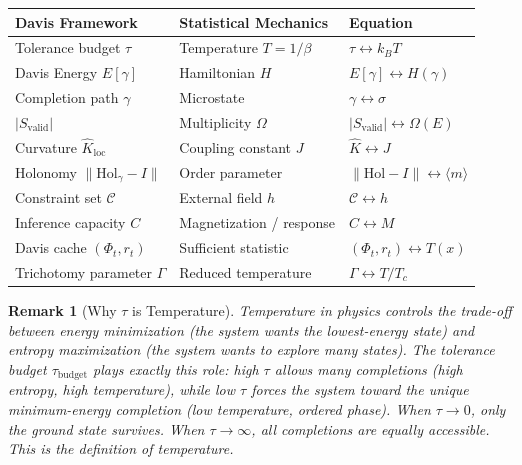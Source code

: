 \documentclass[11pt,letterpaper]{article}
\newtheorem{remark}[conjecture]{Remark}
\newcommand{\Hol}{\mathrm{Hol}}
\newcommand{\Khat}{\hat{K}}
\newcommand{\tbudget}{\tau_{\mathrm{budget}}}
\newcommand{\Svalid}{S_{\mathrm{valid}}}
\begin{document}
\begin{center}
\renewcommand{\arraystretch}{1.4}
\begin{tabular}{lll}
\textbf{Davis Framework} & \textbf{Statistical Mechanics} & \textbf{Equation} \\
\hline
Tolerance budget $\tau$ & Temperature $T = 1/\beta$ & $\tau \leftrightarrow k_B T$ \\
Davis Energy $E[\gamma]$ & Hamiltonian $H$ & $E[\gamma] \leftrightarrow H(\gamma)$ \\
Completion path $\gamma$ & Microstate & $\gamma \leftrightarrow \sigma$ \\
$|\Svalid|$ & Multiplicity $\Omega$ & $|\Svalid| \leftrightarrow \Omega(E)$ \\
Curvature $\Khat_{\mathrm{loc}}$ & Coupling constant $J$ & $\Khat \leftrightarrow J$ \\
Holonomy $\|\Hol_\gamma - I\|$ & Order parameter & $\|\Hol - I\| \leftrightarrow \langle m \rangle$ \\
Constraint set $\mathcal{C}$ & External field $h$ & $\mathcal{C} \leftrightarrow h$ \\
Inference capacity $C$ & Magnetization / response & $C \leftrightarrow M$ \\
Davis cache $(\Phi_t, r_t)$ & Sufficient statistic & $(\Phi_t, r_t) \leftrightarrow T(x)$ \\
Trichotomy parameter $\Gamma$ & Reduced temperature & $\Gamma \leftrightarrow T/T_c$ \\
\end{tabular}
\end{center}

\begin{remark}[Why $\tau$ is Temperature]
Temperature in physics controls the trade-off between energy minimization 
(the system wants the lowest-energy state) and entropy maximization (the 
system wants to explore many states). The tolerance budget $\tbudget$ plays 
exactly this role: high $\tau$ allows many completions (high entropy, high 
temperature), while low $\tau$ forces the system toward the unique 
minimum-energy completion (low temperature, ordered phase). When 
$\tau \to 0$, only the ground state survives. When $\tau \to \infty$, all 
completions are equally accessible. This is the definition of temperature.
\end{remark}
\end{document}
